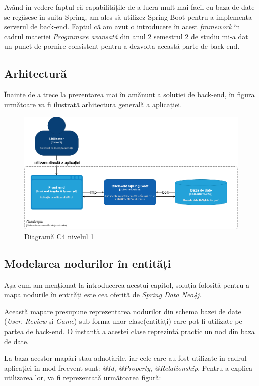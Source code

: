 \documentclass[12pt,a4paper]{report}
\begin{document}
Având în vedere faptul că capabilitățile de a lucra mult mai facil cu baza de date se regăsesc în suita Spring, am ales să utilizez Spring Boot pentru a implementa serverul de back-end. Faptul că am avut o introducere în acest \emph{framework} în cadrul materiei \emph{Programare avansată} din anul 2 semestrul 2 de studiu mi-a dat un punct de pornire consistent pentru a dezvolta această parte de back-end.

\subsection{Arhitectură}

Înainte de a trece la prezentarea mai în amănunt a soluției de back-end, în figura următoare va fi ilustrată arhitectura generală a aplicației.


\begin{figure}[H]
\centering
\caption{}
\includegraphics[scale = 0.5]{exemplu_17_diagrama_c4_nivel_1.drawio}
\caption*{Diagramă C4 nivelul 1}
\end{figure}

\subsection{Modelarea nodurilor în entități}

Așa cum am menționat la introducerea acestui capitol, soluția folosită pentru a mapa nodurile în entități este cea oferită de \emph{Spring Data Neo4j}.

Această mapare presupune reprezentarea nodurilor din schema bazei de date (\emph{User}, \emph{Review} și \emph{Game}) sub forma unor clase(entități) care pot fi utilizate pe partea de back-end. O instanță a acestei clase reprezintă practic un nod din baza de date.

La baza acestor mapări stau adnotările, iar cele care au fost utilizate în cadrul aplicației în mod frecvent sunt: \emph{@Id}, \emph{@Property}, \emph{@Relationship}. Pentru a explica utilizarea lor, va fi reprezentată următoarea figură:
\end{document}
